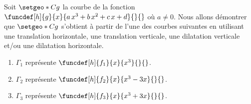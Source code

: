 Soit $\setgeo*{C}{g}$ la courbe de la fonction
$\funcdef[h]{g}{x}{a \, x^3 + b \, x^2 + c \, x + d}{}{}$
où $a\neq 0$.
Nous allons démontrer que $\setgeo*{C}{g}$ s'obtient à partir de l'une des courbes suivantes en utilisant une translation horizontale, une translation verticale, une dilatation verticale et/ou une dilatation horizontale.

\begin{enumerate}
	\item $\Gamma_1$ représente $\funcdef[h]{f_1}{x}{x^3}{}{}$.

	\item $\Gamma_2$ représente $\funcdef[h]{f_2}{x}{x^3 - 3 x}{}{}$.

	\item $\Gamma_3$ représente $\funcdef[h]{f_3}{x}{x^3 + 3 x}{}{}$.
\end{enumerate}


